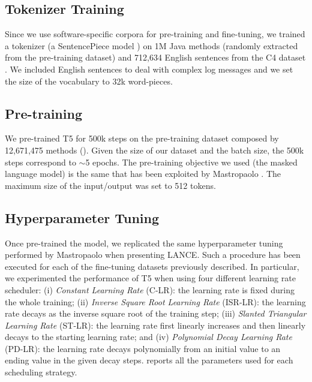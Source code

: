 \subsection{Tokenizer Training}
Since we use software-specific corpora for pre-training and fine-tuning, we trained a tokenizer (\ie a SentencePiece model \cite{kudo2018sentencepiece}) on 1M Java methods (randomly extracted from the pre-training dataset) and 712,634 English sentences from the C4 dataset \cite{raffel2019exploring}. We included English sentences to deal with complex log messages and we set the size of the vocabulary to 32k word-pieces. 

\subsection{Pre-training}
We pre-trained T5 for 500k steps on the pre-training dataset composed by 12,671,475 \java methods (). Given the size of our dataset and the batch size, the 500k steps correspond to $\sim$5 epochs. The pre-training objective we used (\ie the masked language model) is the same that has been exploited by Mastropaolo \etal \cite{mastropaolo2022using}. The maximum size of the input/output was set to 512 tokens.

\subsection{Hyperparameter Tuning}
Once pre-trained the model, we replicated the same hyperparameter tuning performed by Mastropaolo \etal \cite{mastropaolo2021studying} when presenting LANCE. Such a procedure has been executed for each of the fine-tuning datasets previously described. In particular, we experimented the performance of T5 when using four different learning rate scheduler: (i) \textit{Constant Learning Rate} (C-LR): the learning rate is fixed during the whole training; (ii) \textit{Inverse Square Root Learning Rate} (ISR-LR): the learning rate decays as the inverse square root of the training step; (iii) \textit{Slanted Triangular Learning Rate \cite{howard2018universal}} (ST-LR): the learning rate first linearly increases and then linearly decays to the starting learning rate; and (iv) \textit{Polynomial Decay Learning Rate} (PD-LR): the learning rate decays polynomially from an initial value to an ending value in the given decay steps.  reports all the parameters used for each scheduling strategy.

